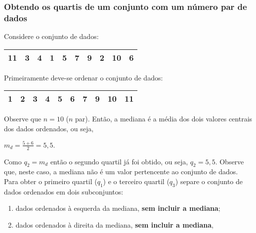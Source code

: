 \documentclass[11pt,fleqn]{book} %
\begin{document}
\subsubsection{Obtendo os quartis de um conjunto com um número par de dados}
\vspace{0,3cm}

\begin{example} \label{exemp:quartisnpar}

Considere o conjunto de dados:

\begin{center}
	\begin{tabular}{c c c c c c c c c c}
	\hline
	11 & 3 & 4 & 1 & 5 & 7 & 9 & 2 & 10 & 6 \\
	\hline
	\end{tabular}
\end{center}

Primeiramente deve-se ordenar o conjunto de dados:

\begin{center}
	\begin{tabular}{c c c c c c c c c c}
	\hline
	1 & 2 & 3 & 4 & \textcolor{ocre}{\bf 5} & \textcolor{ocre}{\bf 6} & 7 & 9 & 10 & 11 \\
	\hline
	\end{tabular}
\end{center}

Observe que $n=10$ ($n$ par).  Então, a mediana é a média dos dois valores centrais dos dados ordenados, ou seja, 
\begin{center}
$\displaystyle m_d=\frac{5+6}{2}=5,5.$
\end{center}

Como $q_2=m_d$ então o segundo quartil já foi obtido, ou seja, $q_2=5,5$. Observe que, neste caso, a mediana não é um valor pertencente ao conjunto de dados.\\

Para obter o primeiro quartil ($q_1$) e o terceiro quartil ($q_3$) separe o conjunto de dados ordenados em dois subconjuntos: \\

\begin{enumerate}[label=\alph*)]
\item dados ordenados à esquerda da mediana, {\bf sem incluir a mediana};
\item dados ordenados à direita da mediana, {\bf sem incluir a mediana}, \\
\end{enumerate}


\end{example}
\end{document}
